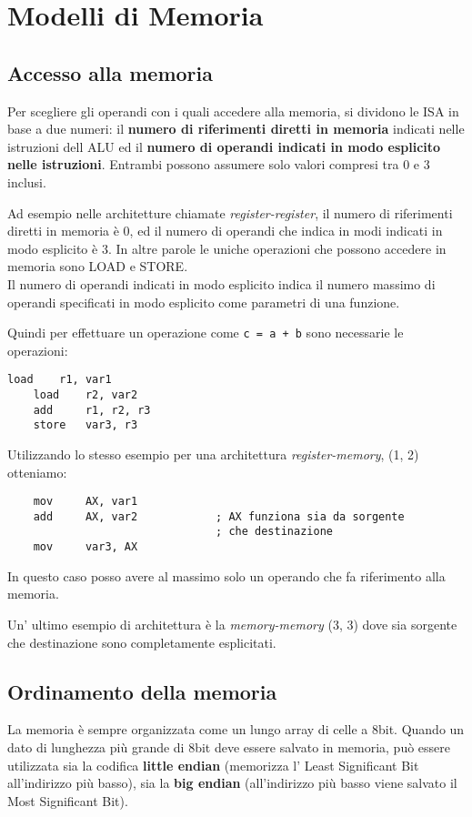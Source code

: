 \documentclass[../ace.tex]{subfiles}
\begin{document}
\section{Modelli di Memoria}
\subsection{Accesso alla memoria}
Per scegliere gli operandi con i quali accedere alla memoria, si dividono le ISA in base a due numeri:
il \textbf{numero di riferimenti diretti in memoria} indicati nelle istruzioni dell ALU
ed il \textbf{numero di operandi indicati in modo esplicito nelle istruzioni}.
Entrambi possono assumere solo valori compresi tra 0 e 3 inclusi.

Ad esempio nelle architetture chiamate \textit{register-register},
il numero di riferimenti diretti in memoria è 0, ed il numero di operandi che indica in modi indicati
in modo esplicito è 3.
In altre parole le uniche operazioni che possono accedere in memoria sono LOAD e STORE.
\\
Il numero di operandi indicati in modo esplicito indica il numero massimo di operandi specificati in
modo esplicito come parametri di una funzione.

Quindi per effettuare un operazione come \lstinline{c = a + b} sono necessarie le operazioni:

\begin{lstlisting}[emph={load,store,add}, emphstyle={\bfseries\color{code-keyword}}]
    load    r1, var1
    load    r2, var2
    add     r1, r2, r3
    store   var3, r3
\end{lstlisting}

Utilizzando lo stesso esempio per una architettura \textit{register-memory}, (1, 2) otteniamo:
\begin{lstlisting}
    mov     AX, var1
    add     AX, var2            ; AX funziona sia da sorgente
                                ; che destinazione
    mov     var3, AX
\end{lstlisting}
In questo caso posso avere al massimo solo un operando che fa riferimento alla memoria.

Un' ultimo esempio di architettura è la \textit{memory-memory} (3, 3) dove sia sorgente che destinazione
sono completamente esplicitati.

\subsection{Ordinamento della memoria}
La memoria è sempre organizzata come un lungo array di celle a 8bit.
Quando un dato di lunghezza più grande di 8bit deve essere salvato in memoria, può essere
utilizzata sia la codifica \textbf{little endian} (memorizza l' Least Significant Bit all'indirizzo
più basso), sia la \textbf{big endian} (all'indirizzo più basso viene salvato il Most Significant
Bit).
\end{document}
